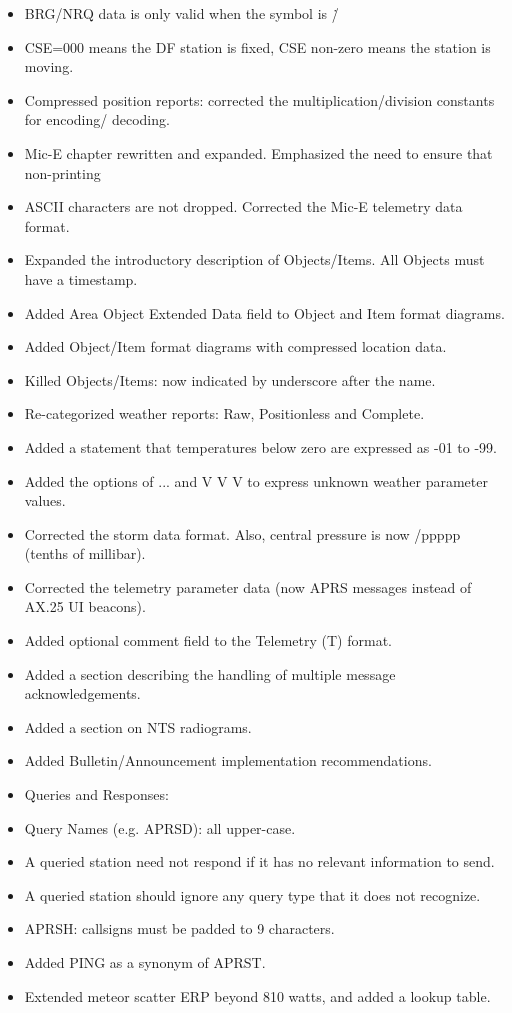   \begin{itemize}
\item   BRG/NRQ data is only valid when the symbol is /\.
\item CSE=000 means the DF station is fixed, CSE non-zero means the station is moving.
\item Compressed position reports: corrected the multiplication/division constants for encoding/
decoding.
\item Mic-E chapter rewritten and expanded. Emphasized the need to ensure that non-printing
\item ASCII characters are not dropped. Corrected the Mic-E telemetry data format.
\item Expanded the introductory description of Objects/Items. All Objects must have a timestamp.
\item Added Area Object Extended Data field to Object and Item format diagrams.
\item Added Object/Item format diagrams with compressed location data.
\item Killed Objects/Items: now indicated by underscore after the name.
\item Re-categorized weather reports: Raw, Positionless and Complete.
\item Added a statement that temperatures below zero are expressed as -01 to -99.
\item Added the options of ... and V V V to express unknown weather parameter values.
\item Corrected the storm data format. Also, central pressure is now /ppppp (tenths of millibar).
\item Corrected the telemetry parameter data (now APRS messages instead of AX.25 UI beacons).
\item Added optional comment field to the Telemetry (T) format.
\item Added a section describing the handling of multiple message acknowledgements.
\item Added a section on NTS radiograms.
\item Added Bulletin/Announcement implementation recommendations.
\item Queries and Responses:
\item Query Names (e.g. APRSD): all upper-case.
\item A queried station need not respond if it has no relevant information to send.
\item A queried station should ignore any query type that it does not recognize.
\item APRSH: callsigns must be padded to 9 characters.
\item Added PING as a synonym of APRST.
\item Extended meteor scatter ERP beyond 810 watts, and added a lookup table.
\end{itemize}
